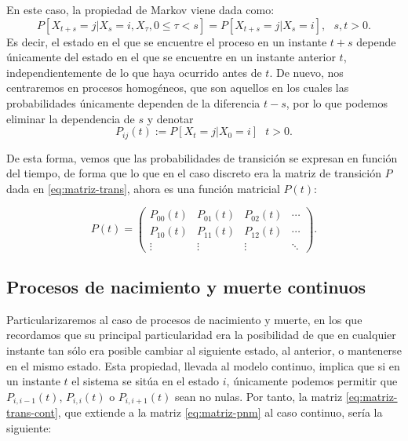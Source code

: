     En este caso, la propiedad de Markov viene dada como:
    \begin{equation}
        P[X_{t+s}=j|X_s=i, X_\tau, 0\leq \tau < s] = P[X_{t+s}=j|X_s=i], \ \ \ s,t>0.
    \end{equation}
    Es decir, el estado en el que se encuentre el proceso en un instante $t+s$ depende únicamente del estado en el que se encuentre en un instante anterior $t$, independientemente de lo que haya ocurrido antes de $t$. De nuevo, nos centraremos en procesos homogéneos, que son aquellos en los cuales las probabilidades únicamente dependen de la diferencia $t-s$, por lo que podemos eliminar la dependencia de $s$ y denotar
    \begin{equation}
        \label{eq:prob-trans-cont}
       P_{ij}(t) := P[X_{t}=j|X_0=i]  \ \ \ t>0.
    \end{equation}
    
    De esta forma, vemos que las probabilidades de transición se expresan en función del tiempo, de forma que lo que en el caso discreto era la matriz de transición $P$ dada en \eqref{eq:matriz-trans}, ahora es una función matricial $P(t)$:

    \begin{equation}
        \label{eq:matriz-trans-cont}
        P(t) = \begin{pmatrix}
            P_{00}(t) & P_{01}(t) & P_{02}(t)  & \cdots \\
            P_{10}(t) & P_{11}(t) & P_{12}(t)  & \cdots \\
            \vdots & \vdots & \vdots  & \ddots 
        \end{pmatrix}.
    \end{equation}

    \subsection{Procesos de nacimiento y muerte continuos}

    Particularizaremos al caso de procesos de nacimiento y muerte, en los que recordamos que su principal particularidad era la posibilidad de que en cualquier instante tan sólo era posible cambiar al siguiente estado, al anterior, o mantenerse en el mismo estado. Esta propiedad, llevada al modelo continuo, implica que si en un instante $t$ el sistema se sitúa en el estado $i$, únicamente podemos permitir que $P_{i,i-1}(t)$, $P_{i,i}(t)$ o $P_{i,i+1}(t)$ sean no nulas. Por tanto, la matriz \eqref{eq:matriz-trans-cont}, que extiende a la matriz \eqref{eq:matriz-pnm} al caso continuo, sería la siguiente:

